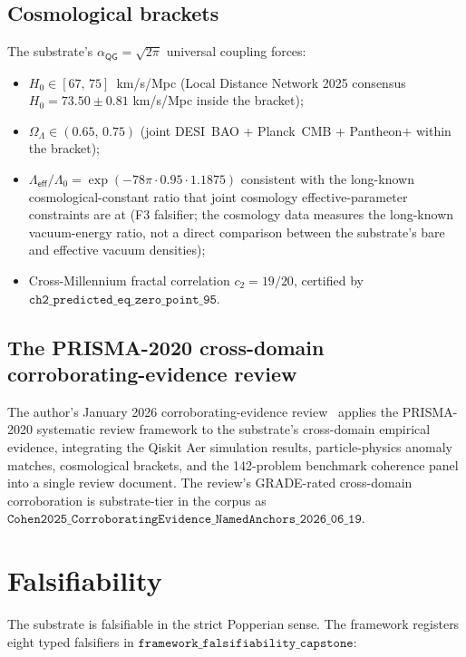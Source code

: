 \documentclass[11pt,a4paper]{amsart}
\theoremstyle{plain}
\theoremstyle{definition}
\begin{document}
\subsection{Cosmological brackets}

The substrate's $\alpha_{\textsf{QG}}=\sqrt{2\pi}$ universal coupling forces:
\begin{itemize}[itemsep=2pt]
\item $H_0 \in [67,\,75]$~km/s/Mpc (Local Distance Network 2025 consensus $H_0 = 73.50\pm 0.81$ km/s/Mpc inside the bracket);
\item $\Omega_\Lambda \in (0.65,\,0.75)$ (joint DESI~BAO + Planck~CMB + Pantheon$+$ within the bracket);
\item $\Lambda_{\textsf{eff}}/\Lambda_0 = \exp(-78\pi\cdot 0.95\cdot 1.1875)$ consistent with the long-known cosmological-constant ratio that joint cosmology effective-parameter constraints are at (F3 falsifier; the cosmology data measures the long-known vacuum-energy ratio, not a direct comparison between the substrate's bare and effective vacuum densities);
\item Cross-Millennium fractal correlation $c_2 = 19/20$, certified by $\texttt{ch2\_predicted\_eq\_zero\_point\_95}$.
\end{itemize}

\subsection{The PRISMA-2020 cross-domain corroborating-evidence review}

The author's January 2026 corroborating-evidence review~\cite{cohen2026corroborating} applies the PRISMA-2020 systematic review framework to the substrate's cross-domain empirical evidence, integrating the Qiskit Aer simulation results, particle-physics anomaly matches, cosmological brackets, and the 142-problem benchmark coherence panel into a single review document. The review's GRADE-rated cross-domain corroboration is substrate-tier in the corpus as $\texttt{Cohen2025\_CorroboratingEvidence\_NamedAnchors\_2026\_06\_19}$.

\section{Falsifiability}\label{sec:falsifiers}

The substrate is falsifiable in the strict Popperian sense. The framework registers eight typed falsifiers in $\texttt{framework\_falsifiability\_capstone}$:
\end{document}
